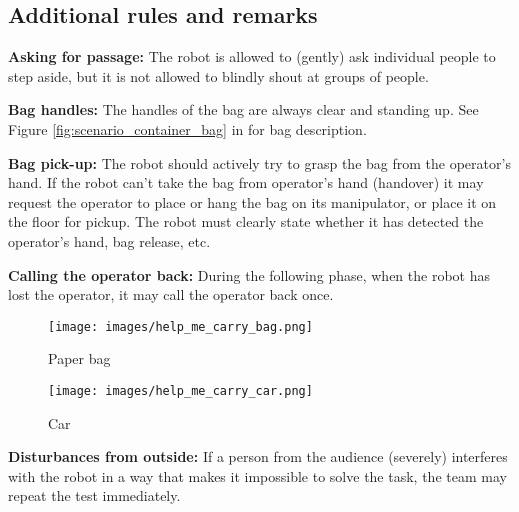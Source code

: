 \subsection{Additional rules and remarks}
\begin{enumerate}
  \begin{minipage}{0.65\textwidth}
  \item \textbf{Asking for passage:} The robot is allowed to (gently) ask individual people to step aside, but it is not allowed to blindly shout at groups of people.

  \item \textbf{Bag handles:} The handles of the bag are always clear and standing up. See Figure \ref{fig:scenario_container_bag} in  for bag description. \footnotemark

  \item \textbf{Bag pick-up:} The robot should actively try to grasp the bag from the operator's hand.
  If the robot can't take the bag from operator's hand (handover) it may request the operator to place or hang the bag on its manipulator, or place it on the floor for pickup.
  The robot must clearly state whether it has detected the operator's hand, bag release, etc.

  \item \textbf{Calling the operator back:} During the following phase, when the robot has lost the operator, it may call the operator back once.
  \end{minipage}\hfill%
  \begin{minipage}{0.65\textwidth}
  \end{minipage}\hfill
  \begin{minipage}{0.25\textwidth}
    \vspace{-20pt}
    \begin{figure}[H]
      \centering
      \texttt{[image: images/help\_me\_carry\_bag.png]}%
      \vspace{-10pt}
      \caption{Paper bag}
      \label{fig:help_me_carry_paper_bag}
    \end{figure}
    \vspace{-10pt}
    \begin{figure}[H]
      \centering
      \texttt{[image: images/help\_me\_carry\_car.png]}%
      \vspace{-20pt}
      \label{fig:help_me_carry_car}
      \caption{Car}
    \end{figure}
  \end{minipage}
  \item \textbf{Disturbances from outside:} If a person from the audience (severely) interferes with the robot in a way that makes it impossible to solve the task, the team may repeat the test immediately.


\end{enumerate}
